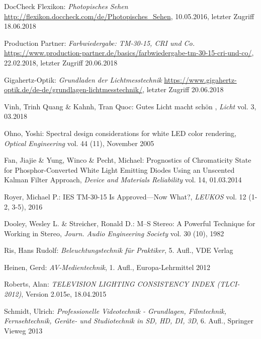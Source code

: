 \begin{thebibliography}{}
DocCheck Flexikon:
\emph{\glqq Photopisches Sehen\grqq}
\url{http://flexikon.doccheck.com/de/Photopisches_Sehen}, 10.05.2016, letzter Zugriff 18.06.2018

Production Partner:
\emph{\glqq Farbwiedergabe: TM-30-15, CRI und Co.\grqq}
\url{https://www.production-partner.de/basics/farbwiedergabe-tm-30-15-cri-und-co/}, 22.02.2018, letzter Zugriff 20.06.2018

Gigahertz-Optik:
\emph{\glqq Grundladen der Lichtmesstechnik\grqq}
\url{https://www.gigahertz-optik.de/de-de/grundlagen-lichtmesstechnik/}, letzter Zugriff 20.06.2018


Vinh, Trinh Quang \& Kahnh, Tran Quoc:
\glqq Gutes Licht macht schön \grqq, 
\emph{Licht} vol. 3, 03.2018

Ohno, Yoshi:
\glqq Spectral design considerations for white LED color rendering\grqq, 
\emph{Optical Engineering} vol. 44 (11), November 2005

Fan, Jiajie \& Yung, Winco \& Pecht, Michael:
\glqq Prognostics of Chromaticity State for Phosphor-Converted White Light Emitting Diodes Using an Unscented Kalman Filter Approach\grqq, 
\emph{Device and Materials Reliability} vol. 14, 01.03.2014

Royer, Michael P.:
\glqq IES TM-30-15 Is Approved—Now What?\grqq, 
\emph{LEUKOS} vol. 12 (1-2, 3-5), 2016


Dooley, Wesley L.  \& Streicher, Ronald D.:
\glqq M--S Stereo: A Powerful Technique for Working in Stereo\grqq, 
\emph{Journ. Audio Engineering Society} vol. 30 (10), 1982

Ris, Hans Rudolf: 
\emph{Beleuchtungstechnik für Praktiker}, 5. Aufl., VDE Verlag

Heinen, Gerd: 
\emph{AV-Medientechnik}, 1. Aufl., Europa-Lehrmittel 2012

Roberts, Alan: 
\emph{TELEVISION LIGHTING CONSISTENCY INDEX (TLCI-2012)}, Version 2.015e, 18.04.2015

Schmidt, Ulrich: 
\emph{Professionelle Videotechnik - Grundlagen, Filmtechnik, Fernsehtechnik, Geräte- und Studiotechnik in SD, HD, DI, 3D}, 6. Aufl., Springer Vieweg 2013


\end{thebibliography}

